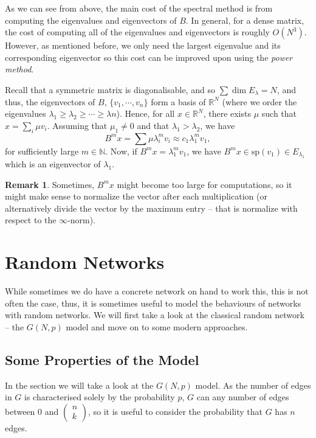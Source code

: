 \documentclass[
]{article}
\theoremstyle{definition}
\newtheorem*{remark}{Remark}
\theoremstyle{definition}
\begin{document}
As we can see from above, the main cost of the spectral method is from
computing the eigenvalues and eigenvectors of \(B\). In general, for a
dense matrix, the cost of computing all of the eigenvalues and
eigenvectors is roughly \(O(N^3)\). However, as mentioned before, we
only need the largest eigenvalue and its corresponding eigenvector so
this cost can be improved upon using the \emph{power method}.

Recall that a symmetric matrix is diagonalisable, and so
\(\sum \dim E_\lambda = N\), and thus, the eigenvectors of \(B\),
\(\{v_1, \cdots, v_n\}\) form a basis of \(\mathbb{R}^N\) (where we
order the eigenvalues
\(\lambda_1 \ge \lambda_2 \ge \cdots \ge \lambda n\)). Hence, for all
\(x \in \mathbb{R}^N\), there exists \(\mu\) such that
\(x = \sum_i \mu v_i\). Assuming that \(\mu_1 \neq 0\) and that
\(\lambda_1 > \lambda_2\), we have
\[B^m x = \sum \mu \lambda_i^m v_i \approx c_1 \lambda_1^m v_1,\] for
sufficiently large \(m \in \mathbb{N}\). Now, if
\(B^m x = \lambda_1^m v_1\), we have
\(B^m x \in \text{sp}(v_1) \in E_{\lambda_1}\) which is an eigenvector
of \(\lambda_1\).

\begin{remark}
  Sometimes, \(B^m x\) might become too large for computations, so it might make 
  sense to normalize the vector after each multiplication (or alternatively divide 
  the vector by the maximum entry -- that is normalize with respect to the 
  \(\infty\)-norm).
\end{remark}

\newpage

\hypertarget{random-networks}{%
\section{Random Networks}\label{random-networks}}

While sometimes we do have a concrete network on hand to work this, this
is not often the case, thus, it is sometimes useful to model the
behaviours of networks with random networks. We will first take a look
at the classical random network -- the \(G(N, p)\) model and move on to
some modern approaches.

\hypertarget{some-properties-of-the-model}{%
\subsection{Some Properties of the
Model}\label{some-properties-of-the-model}}

In the section we will take a look at the \(G(N, p)\) model. As the
number of edges in \(G\) is characterised solely by the probability
\(p\), \(G\) can any number of edges between 0 and
\(\begin{pmatrix} n \\ k \end{pmatrix}\), so it is useful to consider
the probability that \(G\) has \(n\) edges.
\end{document}
